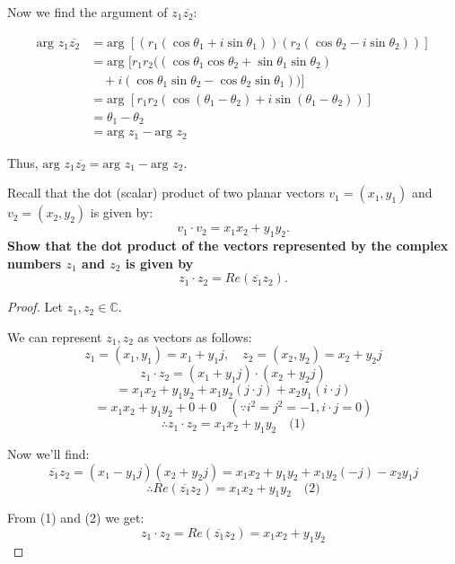 Now we find the argument of $z_1 \overline{z_2}$:

\begin{align*}
    \text{arg } z_1 \overline{z_2} &= \text{arg }[(r_1(\cos \theta_1 + i \sin \theta_1))(r_2(\cos \theta_2 - i \sin \theta_2))] \\
    &= \text{arg }[r_1r_2((\cos \theta_1 \cos \theta_2 + \sin \theta_1 \sin \theta_2) \\
    &\quad + i(\cos \theta_1 \sin \theta_2 - \cos \theta_2 \sin \theta_1))] \\
    &= \text{arg }[r_1r_2(\cos(\theta_1 - \theta_2) + i \sin(\theta_1 - \theta_2))] \\
    &= \theta_1 - \theta_2 \\
    &= \text{arg } z_1 - \text{arg } z_2
\end{align*}

Thus, $\text{arg } z_1 \overline{z_2} = \text{arg } z_1 - \text{arg } z_2$.

\begin{exercise}
    Recall that the dot (scalar) product of two planar vectors $v_1 = (x_1, y_1)$ and $v_2 = (x_2, y_2)$ is given by:
    \[ v_1 \cdot v_2 = x_1x_2 + y_1y_2. \]
\textbf{Show that the dot product of the vectors represented by the complex numbers $z_1$ and $z_2$ is given by}
\[ z_1 \cdot z_2 = Re(\overline{z_1}z_2). \]
\end{exercise}
\begin{proof}
    Let $z_1, z_2 \in \mathbb{C}$.

We can represent $z_1, z_2$ as vectors as follows:
\[ z_1 = (x_1, y_1) = x_1 + y_1j, \quad z_2 = (x_2, y_2) = x_2 + y_2j \]
\[ z_1 \cdot z_2 = (x_1 + y_1j) \cdot (x_2 + y_2j) \]
\[ = x_1x_2 + y_1y_2 + x_1y_2(j \cdot j) + x_2y_1(i \cdot j) \]
\[ = x_1x_2 + y_1y_2 + 0 + 0 \quad (\because i^2 = j^2 = -1, i \cdot j = 0) \]
\[ \therefore z_1 \cdot z_2 = x_1x_2 + y_1y_2 \quad \text{(1)} \]

Now we'll find:
\[ \overline{z_1}z_2 = (x_1 - y_1j)(x_2 + y_2j) = x_1x_2 + y_1y_2 + x_1y_2(-j) - x_2y_1j \]
\[ \therefore Re(\overline{z_1}z_2) = x_1x_2 + y_1y_2 \quad \text{(2)} \]

From (1) and (2) we get:
\[ z_1 \cdot z_2 = Re(\overline{z_1}z_2) = x_1x_2 + y_1y_2 \]
\end{proof}

